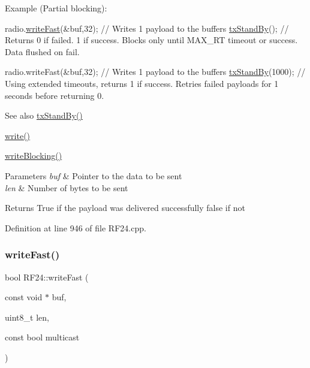 \begin{DoxyCode}
Example (Partial blocking):

        radio.\hyperlink{classRF24_a47b2516993481b58e724d1274a7fd9cb}{writeFast}(&buf,32);  \textcolor{comment}{// Writes 1 payload to the buffers}
        \hyperlink{classRF24_a12cc453453c94969d4d3f0edb3778c83}{txStandBy}();               \textcolor{comment}{// Returns 0 if failed. 1 if success. Blocks only until MAX\_RT
       timeout or success. Data flushed on fail.}

        radio.writeFast(&buf,32);  \textcolor{comment}{// Writes 1 payload to the buffers}
        \hyperlink{classRF24_a12cc453453c94969d4d3f0edb3778c83}{txStandBy}(1000);           \textcolor{comment}{// Using extended timeouts, returns 1 if success. Retries
       failed payloads for 1 seconds before returning 0.}
\end{DoxyCode}


\begin{DoxySeeAlso}{See also}
\hyperlink{classRF24_a12cc453453c94969d4d3f0edb3778c83}{tx\+Stand\+By()} 

\hyperlink{classRF24_a4cd4c198a47704db20b6b5cf0731cd58}{write()} 

\hyperlink{classRF24_ae6fd8d5ee490d54ae1cb2e8fefee535f}{write\+Blocking()}
\end{DoxySeeAlso}

\begin{DoxyParams}{Parameters}
{\em buf} & Pointer to the data to be sent \\
\hline
{\em len} & Number of bytes to be sent \\
\hline
\end{DoxyParams}
\begin{DoxyReturn}{Returns}
True if the payload was delivered successfully false if not 
\end{DoxyReturn}


Definition at line 946 of file R\+F24.\+cpp.

\mbox{\label{classRF24_ad16d53de0327c0b41d170cbda4bf41af}} 
\subsubsection{\texorpdfstring{write\+Fast()}{writeFast()}\hspace{0.1cm}{\footnotesize\ttfamily [2/2]}}
{\footnotesize\ttfamily bool R\+F24\+::write\+Fast (\begin{DoxyParamCaption}\item[{const void $\ast$}]{buf,  }\item[{uint8\+\_\+t}]{len,  }\item[{const bool}]{multicast }\end{DoxyParamCaption})}

